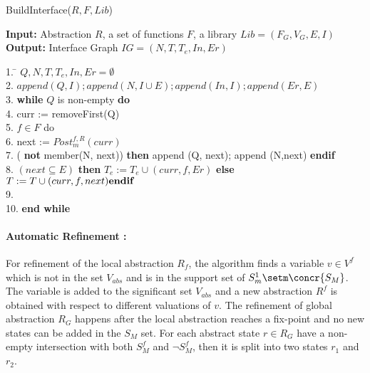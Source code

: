 \documentclass{llncs}
\begin{document}
\begin{algorithm}[htb]
\caption{BuildInterface($R, F, Lib$)} \label{algo-build}
{\bf Input:} Abstraction $R$, a set of functions $F$, a library $Lib  = (F_G, V_G, E, I)$ \\
 {\bf Output:} Interface Graph $IG = (N, T, T_{e}, In, Er)$
 \vspace*{-1ex}
\begin{tabbing}
1.  \= $ Q, N,T, T_{e},In,Er = \emptyset$\\
2.  \>  $append(Q, I); append(N,I \cup E); append(In,I); append(Er,E)$\\
3.  \> {\bf while} $Q$ is non-empty {\bf do}\\
4.  \> \quad curr := removeFirst(Q)\\
5.  \>  $f \in F$ do \\
6.  \> \quad \quad next := $Post^{f,R}_m(curr)$ \\
7.  \> \quad {} ( {\bf not} member(N, next)) {\bf then} append (Q, next); append (N,next) {\bf endif}\\
8.  \> \quad {} $(next \subseteq E)$ {\bf then} $T_{e} := T_{e} \cup (curr,f,Er)$ {\bf else}  $T := T \cup (curr,f,next) {\bf endif}$\\   
9. \>  \\
10. \>  {\bf end while}\\  
\end{tabbing}
\vspace*{-3ex}
\end{algorithm}
\paragraph{Automatic Refinement :} 
For refinement of the local abstraction $R_f$, the algorithm finds a variable $v \in V^f$ which is not 
in the set $V_{abs}$ and is in the support set of  $S_m^1 \setm \concr{S_M}$.
The variable is added to the significant set $V_{abs}$ and a new abstraction $R^f$ is obtained
with respect to different valuations of $v$.
The refinement of global abstraction $R_G$ happens after the local abstraction reaches a fix-point
and no new states can be added in the $S_M$ set. 
For each abstract state $r \in R_G$ have a non-empty intersection with both 
$S^f_M$ and $\lnot S^f_M$, then it is split into two states $r_1$ and $r_2$.
\end{document}
